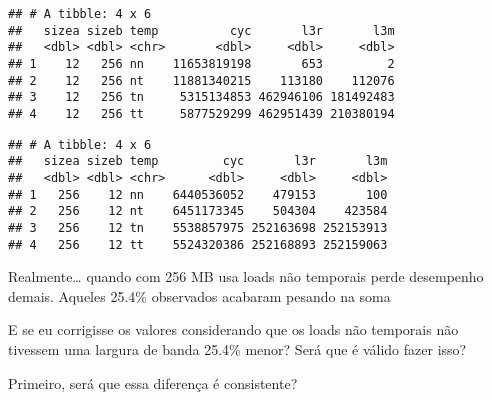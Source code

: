 \documentclass[
]{article}
\newenvironment{Shaded}{\begin{snugshade}}{\end{snugshade}}
\newcommand{\DecValTok}[1]{\textcolor[rgb]{0.00,0.00,0.81}{#1}}
\newcommand{\KeywordTok}[1]{\textcolor[rgb]{0.13,0.29,0.53}{\textbf{#1}}}
\newcommand{\NormalTok}[1]{#1}
\newcommand{\OperatorTok}[1]{\textcolor[rgb]{0.81,0.36,0.00}{\textbf{#1}}}
\newcommand{\StringTok}[1]{\textcolor[rgb]{0.31,0.60,0.02}{#1}}
\begin{document}
\begin{verbatim}
## # A tibble: 4 x 6
##   sizea sizeb temp          cyc       l3r       l3m
##   <dbl> <dbl> <chr>       <dbl>     <dbl>     <dbl>
## 1    12   256 nn    11653819198       653         2
## 2    12   256 nt    11881340215    113180    112076
## 3    12   256 tn     5315134853 462946106 181492483
## 4    12   256 tt     5877529299 462951439 210380194
\end{verbatim}

\begin{Shaded}
\end{Shaded}

\begin{verbatim}
## # A tibble: 4 x 6
##   sizea sizeb temp         cyc       l3r       l3m
##   <dbl> <dbl> <chr>      <dbl>     <dbl>     <dbl>
## 1   256    12 nn    6440536052    479153       100
## 2   256    12 nt    6451173345    504304    423584
## 3   256    12 tn    5538857975 252163698 252153913
## 4   256    12 tt    5524320386 252168893 252159063
\end{verbatim}

Realmente\ldots{} quando com 256 MB usa loads não temporais perde
desempenho demais. Aqueles 25.4\% observados acabaram pesando na soma

E se eu corrigisse os valores considerando que os loads não temporais
não tivessem uma largura de banda 25.4\% menor? Será que é válido fazer
isso?

Primeiro, será que essa diferença é consistente?

\begin{Shaded}
\end{Shaded}
\end{document}
